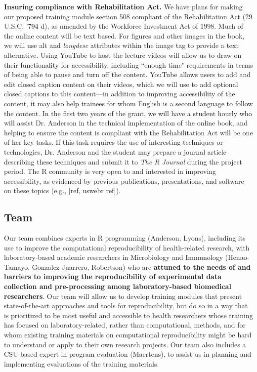 \documentclass[pdftex,english,11pt,parskip=half]{scrartcl}
\begin{document}
\noindent \textbf{Insuring compliance with Rehabilitation Act.} We have plans for making our proposed training module section 508 compliant of the Rehabilitation Act (29 U.S.C. '794 d), as amended by the Workforce Investment Act of 1998. Much of the online content will be text based. For figures and other images in the book, we will use alt and \textit{longdesc} attributes within the image tag to provide a text alternative. Using YouTube to host the lecture videos will allow us to draw on their functionality for accessibility, including ``enough time" requirements in terms of being able to pause and turn off the content. YouTube allows users to add and edit closed caption content on their videos, which we will use to add optional closed captions to this content---in addition to improving accessibility of the content, it may also help trainees for whom English is a second language to follow the content. In the first two years of the grant, we will have a student hourly who will assist Dr. Anderson in the technical implementation of the online book, and helping to ensure the content is compliant with the Rehabilitation Act will be one of her key tasks. If this task requires the use of interesting techniques or technologies, Dr. Anderson and the student may prepare a journal article describing these techniques and submit it to \textit{The R Journal} during the project period. The R community is very open to and interested in improving accessibility, as evidenced by previous publications, presentations, and software on these topics (e.g., [ref, uswebr ref]).

\subsection{Team}

Our team combines experts in R programming (Anderson, Lyons), including its use to improve the computational reproducibility of health-related research, with laboratory-based academic researchers in Microbiology and Immunology (Henao-Tamayo, Gonzalez-Juarrero, Robertson) who are \textbf{attuned to the needs of and barriers to improving the reproducibility of experimental data collection and pre-processing among laboratory-based biomedical researchers}. Our team will allow us to develop training modules that present state-of-the-art approaches and tools for reproducibility, but do so in a way that is prioritized to be most useful and accessible to health researchers whose training has focused on laboratory-related, rather than computational, methods, and for whom existing training materials on computational reproducibility might be hard to understand or apply to their own research projects. Our team also includes a CSU-based expert in program evaluation (Maertens), to assist us in planning and implementing evaluations of the training materials.
\end{document}

